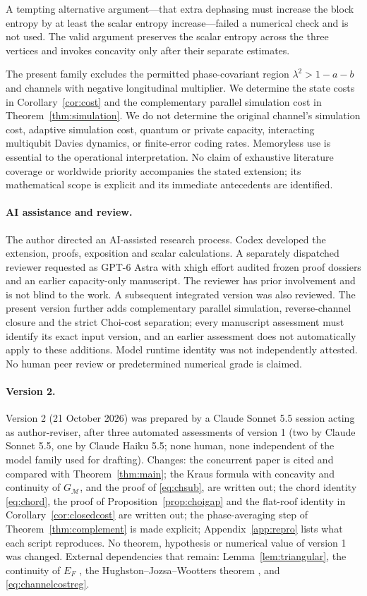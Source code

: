 \documentclass[11pt]{article}
\begin{document}
A tempting alternative argument---that extra dephasing must increase the block entropy by at least the scalar entropy increase---failed a numerical check and is not used. The valid argument preserves the scalar entropy across the three vertices and invokes concavity only after their separate estimates.

The present family excludes the permitted phase-covariant region $\lambda^2>1-a-b$ and channels with negative longitudinal multiplier. We determine the state costs in Corollary~\ref{cor:cost} and the complementary parallel simulation cost in Theorem~\ref{thm:simulation}. We do not determine the original channel's simulation cost, adaptive simulation cost, quantum or private capacity, interacting multiqubit Davies dynamics, or finite-error coding rates. Memoryless use is essential to the operational interpretation. No claim of exhaustive literature coverage or worldwide priority accompanies the stated extension; its mathematical scope is explicit and its immediate antecedents are identified.

\paragraph{AI assistance and review.}
The author directed an AI-assisted research process. Codex developed the extension, proofs, exposition and scalar calculations. A separately dispatched reviewer requested as GPT-6 Astra with xhigh effort audited frozen proof dossiers and an earlier capacity-only manuscript. The reviewer has prior involvement and is not blind to the work. A subsequent integrated version was also reviewed. The present version further adds complementary parallel simulation, reverse-channel closure and the strict Choi-cost separation; every manuscript assessment must identify its exact input version, and an earlier assessment does not automatically apply to these additions. Model runtime identity was not independently attested. No human peer review or predetermined numerical grade is claimed.

\paragraph{Version 2.}
Version 2 (21 October 2026) was prepared by a Claude Sonnet 5.5 session acting as author-reviser, after three automated assessments of version 1 (two by Claude Sonnet 5.5, one by Claude Haiku 5.5; none human, none independent of the model family used for drafting). Changes: the concurrent paper \cite{fang} is cited and compared with Theorem~\ref{thm:main}; the Kraus formula with concavity and continuity of $G_{\mathcal M}$, and the proof of \eqref{eq:chsub}, are written out; the chord identity \eqref{eq:chord}, the proof of Proposition~\ref{prop:choigap} and the flat-roof identity in Corollary~\ref{cor:closedcost} are written out; the phase-averaging step of Theorem~\ref{thm:complement} is made explicit; Appendix~\ref{app:repro} lists what each script reproduces. No theorem, hypothesis or numerical value of version 1 was changed. External dependencies that remain: Lemma~\ref{lem:triangular}, the continuity of $E_F$ \cite{nielsen,winter}, the Hughston--Jozsa--Wootters theorem \cite{hjw}, and \eqref{eq:channelcostreg}.
\end{document}
